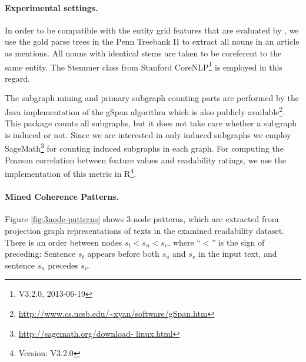 \paragraph{Experimental settings.} 
In order to be compatible with the entity grid features that are evaluated by , we use the gold parse trees in the Penn Treebank II \cite{marcus94} to extract all nouns in an article as mentions. 
All nouns with identical stems are taken to be coreferent to the same entity. 
The Stemmer class from Stanford CoreNLP\footnote{V3.2.0, 2013-06-19} is employed in this regard. 

The subgraph mining and primary subgraph counting parts are performed by the Java implementation of the gSpan algorithm which is also publicly available\footnote{\url{http://www.cs.ucsb.edu/~xyan/software/gSpan.htm}}. 
This package counts all subgraphs, but it does not take care whether a subgraph is induced or not. 
Since we are interested in only induced subgraphs we employ SageMath\footnote{\url{http://sagemath.org/download- linux.html}} for counting induced subgraphs in each graph.  
For computing the Pearson correlation between feature values and readability ratings, we use the implementation of this metric in R\footnote{Version: V3.2.0}. 

\paragraph{Mined Coherence Patterns.} 
Figure \ref{fig:3node-patterns} shows 3-node patterns, which are extracted from projection graph representations of texts in the examined readability dataset. 
There is an order between nodes $s_t < s_u < s_v$, where ``$<$'' is the sign of preceding: Sentence $s_t$ appears before both $s_u$ and $s_v$ in the input text, and sentence $s_u$ precedes $s_v$. 


